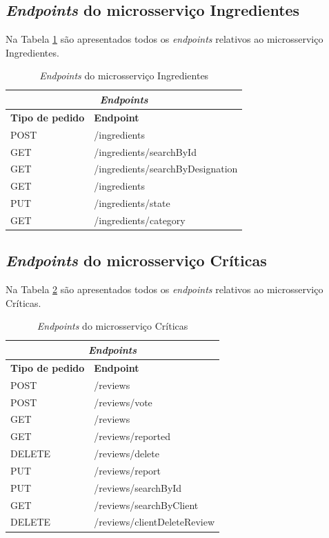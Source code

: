 \subsection{\textit{Endpoints} do microsserviço Ingredientes}
Na Tabela \ref{table:endpoints2} são apresentados todos os \textit{endpoints} relativos ao microsserviço Ingredientes.

\begin{table}[H]
\caption{\textit{Endpoints} do microsserviço Ingredientes}
\label{table:endpoints2}
\begin{center}
\begin{tabular}{ |p{4cm}|p{6cm}|  }
\hline
\multicolumn{2}{|c|}{\textit{Endpoints}} \\
\hline
\textbf{Tipo de pedido} & \textbf{Endpoint}\\
\hline
POST & /ingredients \\
\hline
GET & /ingredients/searchById \\
\hline
GET & /ingredients/searchByDesignation \\
\hline
GET & /ingredients \\
\hline
PUT & /ingredients/state \\
\hline
GET & /ingredients/category \\
\hline
\end{tabular} 
\end{center}
\end{table}

\subsection{\textit{Endpoints} do microsserviço Críticas}
Na Tabela \ref{table:endpoints3} são apresentados todos os \textit{endpoints} relativos ao microsserviço Críticas.

\begin{table}[H]
\caption{\textit{Endpoints} do microsserviço Críticas}
\label{table:endpoints3}
\begin{center}
\begin{tabular}{ |p{4cm}|p{6cm}|  }
\hline
\multicolumn{2}{|c|}{\textit{Endpoints}} \\
\hline
\textbf{Tipo de pedido} & \textbf{Endpoint}\\
\hline
POST & /reviews \\
\hline
POST & /reviews/vote \\
\hline
GET & /reviews \\
\hline
GET & /reviews/reported \\
\hline
DELETE & /reviews/delete \\
\hline 
PUT & /reviews/report \\
\hline
PUT & /reviews/searchById \\
\hline
GET & /reviews/searchByClient \\
\hline
DELETE & /reviews/clientDeleteReview \\
\hline 
\end{tabular} 
\end{center}
\end{table}

